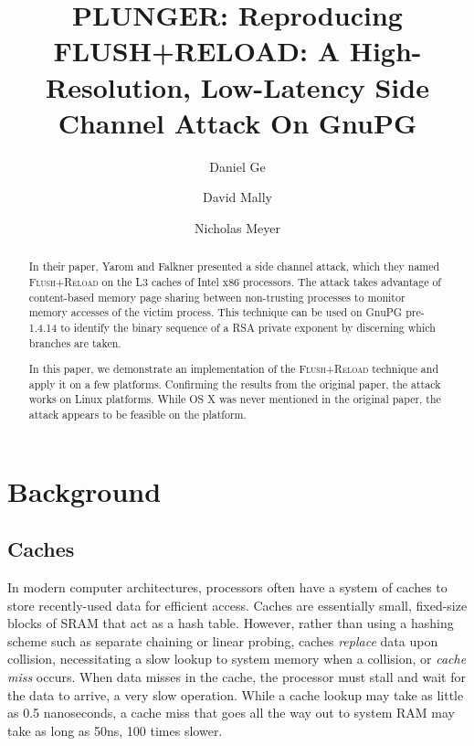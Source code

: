\documentclass[11pt]{llncs}
\newcommand{\flushreload}{\textsc{Flush}+\textsc{Reload}}
\begin{document}
\title{PLUNGER: Reproducing FLUSH+RELOAD: A High-Resolution, Low-Latency Side
Channel Attack On GnuPG}
\author{Daniel Ge \and David Mally \and Nicholas Meyer}
\maketitle

\lobwatermark

\begin{abstract}

    In their paper, Yarom and Falkner\cite{YF13} presented a side channel
    attack, which they named \flushreload{} on the L3 caches of Intel x86
    processors. The attack takes advantage of content-based memory page sharing
    between non-trusting processes to monitor memory accesses of the victim
    process. This technique can be used on GnuPG pre-1.4.14 to identify the
    binary sequence of a RSA private exponent by discerning which branches are
    taken.

    In this paper, we demonstrate an implementation of the \flushreload{}
    technique and apply it on a few platforms. Confirming the results from the
    original paper, the attack works on Linux platforms. While OS X was never
    mentioned in the original paper, the attack appears to be feasible on the
    platform.

\end{abstract}

\section{Background}
\subsection{Caches}

In modern computer architectures, processors often have a system of caches to
store recently-used data for efficient access. Caches are essentially small,
fixed-size blocks of SRAM that act as a hash table. However, rather than using a
hashing scheme such as separate chaining or linear probing, caches
\textit{replace} data upon collision, necessitating a slow lookup to system
memory when a collision, or \textit{cache miss} occurs. When data misses in the
cache, the processor must stall and wait for the data to arrive, a very slow
operation. While a cache lookup may take as little as 0.5 nanoseconds, a cache
miss that goes all the way out to system RAM may take as long as 50ns, 100 times
slower.
\end{document}
